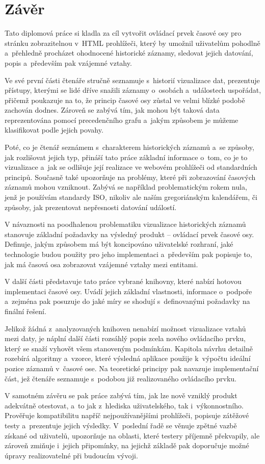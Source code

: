 \chapter{Závěr}
\label{zaver}

	Tato diplomová práce si kladla za cíl vytvořit ovládací prvek časové osy pro stránku zobrazitelnou v~HTML prohlížeči, který by umožnil uživatelům pohodlně a~přehledně procházet ohodnocené historické záznamy, sledovat jejich datování, popis a~přede\-vším pak vzájemné vztahy.
	
	Ve své první části čtenáře stručně seznamuje s~historií vizualizace dat, prezentuje přístupy, kterými se lidé dříve snažili záznamy o~osobách a~událostech uspořádat, přičemž poukazuje na to, že princip časové osy zůstal ve velmi blízké podobě zachován dodnes. Zároveň se zabývá tím, jak mohou být taková data reprezentována pomocí precedenčního grafu a~jakým způsobem je můžeme klasifikovat podle jejich povahy.
		
	Poté, co je čtenář seznámem s~charakterem historických záznamů a~se způsoby, jak rozlišovat jejich typ, přináší tato práce základní informace o~tom, co je to vizualizace a~jak se odlišuje její realizace ve webovém prohlížeči od standardních principů. Současně také upozorňuje na problémy, které při zobrazování časových záznamů mohou vzniknout. Zabývá se například problematickým rokem nula, jenž je používám standardy ISO, nikoliv ale naším gregoriánským kalendářem, či způsoby, jak prezentovat nepřesnosti datování událostí.
	
	V návaznosti na poodhalenou problematiku vizualizace historických záznamů stanovuje základní požadavky na výsledný produkt -- ovládací prvek časové osy. Definuje, jakým způsobem má být koncipováno uživa\-telské rozhraní, jaké technologie budou použity pro jeho implementaci a~přede\-vším pak popisuje to, jak má časová osa zobrazovat vzájemné vztahy mezi entitami.
	
	V další části představuje tato práce vybrané knihovny, které nabízí hotovou implementaci časové osy. Uvádí jejich základní vlastnosti, informace o~podpoře a~zejména pak posuzuje do jaké míry se shodují s~definovanými požadavky na finální řešení.
	
	Jelikož žádná z~analyzovaných knihoven nenabízí možnost vizualizace vztahů mezi daty, je náplní další části rozsáhlý popis zcela nového ovládacího prvku, který se snaží vyhovět všem stanoveným podmínkám. Kapitola návrhu detailně rozebírá algoritmy a~vzorce, které výsledná aplikace použije k~výpočtu ideální pozice záznamů v~časové ose. Na teoretické principy pak navazuje implementační část, jež čtenáře seznamuje s~podobou již realizovaného ovládacího prvku.

	V samotném závěru se pak práce zabývá tím, jak lze nově vzniklý produkt adekvátně otestovat, a~to jak z~hlediska uživatelského, tak i~výkonnostního. Prověřuje kompatibilitu napříč nejpoužívanějšími prohlížeči, popisuje zátěžové testy a~prezentuje jejich výsledky. V~poslední řadě se věnuje zpětné vazbě získané od uživatelů, upozorňuje na oblasti, které testery příjemně překvapily, ale zároveň zmiňuje i~jejich připomínky, na jejichž základě pak doporučuje možné úpravy rea\-lizovatelné při budoucím vývoji.
